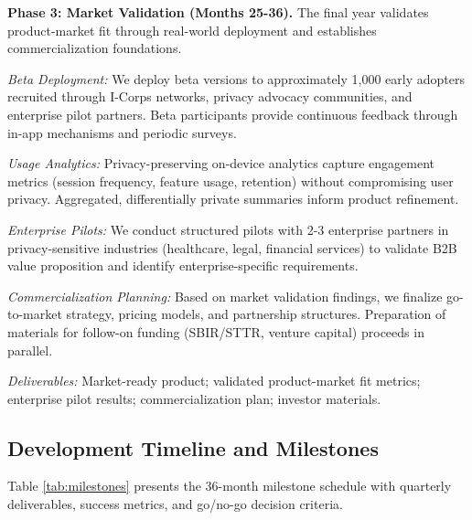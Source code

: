 \documentclass[11pt]{article}
\begin{document}
\textbf{Phase 3: Market Validation (Months 25-36).}
The final year validates product-market fit through real-world deployment and establishes commercialization foundations.

\textit{Beta Deployment:} We deploy beta versions to approximately 1,000 early adopters recruited through I-Corps networks, privacy advocacy communities, and enterprise pilot partners. Beta participants provide continuous feedback through in-app mechanisms and periodic surveys.

\textit{Usage Analytics:} Privacy-preserving on-device analytics capture engagement metrics (session frequency, feature usage, retention) without compromising user privacy. Aggregated, differentially private summaries inform product refinement.

\textit{Enterprise Pilots:} We conduct structured pilots with 2-3 enterprise partners in privacy-sensitive industries (healthcare, legal, financial services) to validate B2B value proposition and identify enterprise-specific requirements.

\textit{Commercialization Planning:} Based on market validation findings, we finalize go-to-market strategy, pricing models, and partnership structures. Preparation of materials for follow-on funding (SBIR/STTR, venture capital) proceeds in parallel.

\textit{Deliverables:} Market-ready product; validated product-market fit metrics; enterprise pilot results; commercialization plan; investor materials.

\vspace*{-8pt}
\subsection{Development Timeline and Milestones}
\vspace*{-8pt}
Table \ref{tab:milestones} presents the 36-month milestone schedule with quarterly deliverables, success metrics, and go/no-go decision criteria.
\end{document}
